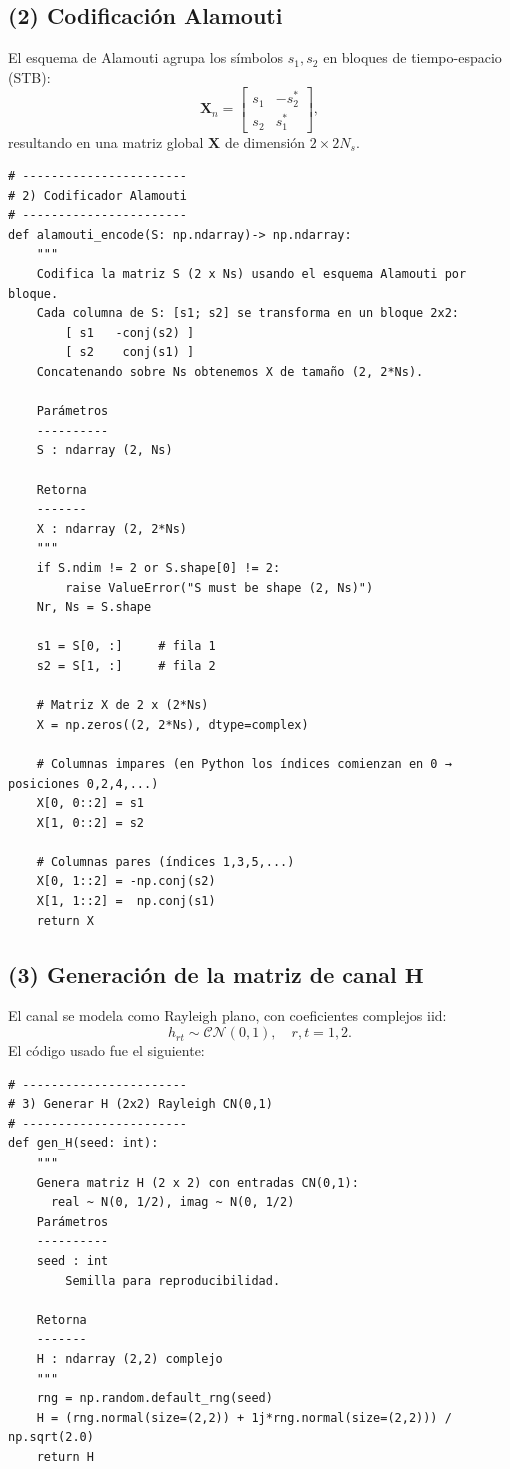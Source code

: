 \documentclass[11pt]{article}
\begin{document}
\subsection*{(2) Codificación Alamouti}

El esquema de Alamouti agrupa los símbolos $s_1, s_2$ en bloques de tiempo-espacio (STB):
\[
\mathbf{X}_n =
\begin{bmatrix}
s_1 & -s_2^* \\
s_2 &  s_1^*
\end{bmatrix},
\]
resultando en una matriz global $\mathbf{X}$ de dimensión $2\times 2N_s$.

\begin{verbatim}
# -----------------------
# 2) Codificador Alamouti
# -----------------------
def alamouti_encode(S: np.ndarray)-> np.ndarray:
    """
    Codifica la matriz S (2 x Ns) usando el esquema Alamouti por bloque.
    Cada columna de S: [s1; s2] se transforma en un bloque 2x2:
        [ s1   -conj(s2) ]
        [ s2    conj(s1) ]
    Concatenando sobre Ns obtenemos X de tamaño (2, 2*Ns).

    Parámetros
    ----------
    S : ndarray (2, Ns)

    Retorna
    -------
    X : ndarray (2, 2*Ns)
    """
    if S.ndim != 2 or S.shape[0] != 2:
        raise ValueError("S must be shape (2, Ns)")
    Nr, Ns = S.shape

    s1 = S[0, :]     # fila 1
    s2 = S[1, :]     # fila 2

    # Matriz X de 2 x (2*Ns)
    X = np.zeros((2, 2*Ns), dtype=complex)

    # Columnas impares (en Python los índices comienzan en 0 → posiciones 0,2,4,...)
    X[0, 0::2] = s1
    X[1, 0::2] = s2

    # Columnas pares (índices 1,3,5,...)
    X[0, 1::2] = -np.conj(s2)
    X[1, 1::2] =  np.conj(s1)
    return X
\end{verbatim}

\subsection*{(3) Generación de la matriz de canal $\mathbf{H}$}

El canal se modela como Rayleigh plano, con coeficientes complejos iid:
\[
h_{rt} \sim \mathcal{CN}(0,1), \quad r,t = 1,2.
\]
El código usado fue el siguiente:

\begin{verbatim}
# -----------------------
# 3) Generar H (2x2) Rayleigh CN(0,1)
# -----------------------
def gen_H(seed: int):
    """
    Genera matriz H (2 x 2) con entradas CN(0,1):
      real ~ N(0, 1/2), imag ~ N(0, 1/2)
    Parámetros
    ----------
    seed : int
        Semilla para reproducibilidad.

    Retorna
    -------
    H : ndarray (2,2) complejo
    """
    rng = np.random.default_rng(seed)
    H = (rng.normal(size=(2,2)) + 1j*rng.normal(size=(2,2))) / np.sqrt(2.0)
    return H
\end{verbatim}
\end{document}
